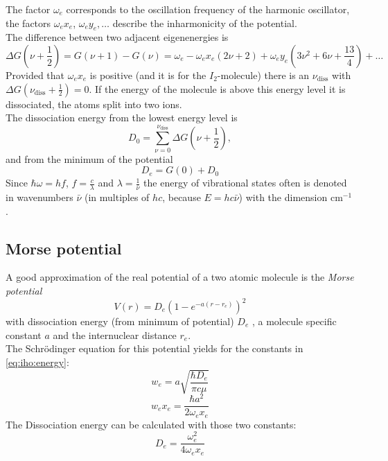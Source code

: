 The factor $\omega_e$ corresponds to the oscillation frequency of the harmonic oscillator, the factors $\omega_e x_e$, $\omega_e y_e, \ldots$ 
describe the inharmonicity of the potential. \\
The difference between two adjacent eigenenergies is
\begin{equation}
\label{eq:iho:energydiff}
  \Delta G \left( \nu + \frac{1}{2} \right) = G(\nu + 1) - G(\nu) = \omega_e - \omega_e x_e (2\nu + 2) + \omega_e y_e \left( 3\nu^2 + 6 \nu + \frac{13}{4} \right) + \ldots 
\end{equation}
Provided that $\omega_e x_e$ is positive (and it is for the $I_2$-molecule) there is an 
$\nu_{\text{diss}}$ with $\Delta G (\nu_{\text{diss}} + \frac{1}{2}) = 0$. If the energy of the molecule is above this energy level it 
is dissociated, the atoms split into two ions. \\
The dissociation energy from the lowest energy level is
\begin{equation}
\label{eq:dissenergy}
  D_0 = \sum_{\nu=0}^{\nu_{\text{diss}}} \Delta G \left( \nu + \frac{1}{2} \right),
\end{equation}
and from the minimum of the potential
\begin{equation}
\label{eq:dissenergy2}
  D_e = G(0) + D_0
\end{equation} 
Since $\hbar \omega = h f$, $f = \frac{c}{\lambda}$ and $\lambda = \frac{1}{\bar{\nu}}$ the energy of vibrational states often is denoted in 
wavenumbers $\bar{\nu}$ (in multiples of $h c$, because $E = hc\bar{\nu}$) with the dimension $\text{cm}^{-1}$.

\subsection{Morse potential}
A good approximation of the real potential of a two atomic molecule is the \emph{Morse potential}
\begin{equation}
  V(r) = D_e \left( 1 - e^{-a(r-r_e)} \right)^2
\end{equation}
with dissociation energy (from minimum of potential) $D_e$ , a molecule specific constant $a$  and the internuclear distance $r_e$. \\
The Schrödinger equation for this potential yields for the constants in \autoref{eq:iho:energy}:
\begin{equation}
\label{eq:morse_we}
  w_e = a \sqrt{\frac{\hbar D_e}{\pi c \mu}}
\end{equation}
\begin{equation}
\label{eq_morse_wexe}
  w_e x_e = \frac{\hbar a^2}{2 \omega_e x_e}
\end{equation}
The Dissociation energy can be calculated with those two constants:
\begin{equation}
\label{eq:morse_dissenergy}
  D_e = \frac{\omega_e^2}{4 \omega_e x_e}
\end{equation}

